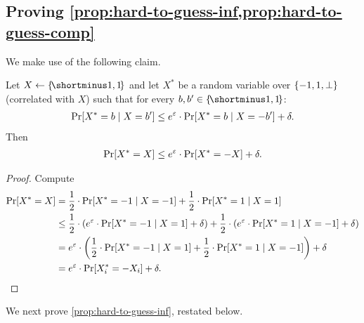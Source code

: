 \subsection{Proving \cref{prop:hard-to-guess-inf,prop:hard-to-guess-comp}}\label{sec:missing-proofs:hard-to-guess}

We make use of the following claim.

\begin{claim}\label{claim:X-star}
    Let $X \la \oo$ and let $X^*$ be a random variable over $\set{-1,1,\bot}$ (correlated with $X$) such that for every $b,b' \in \oo$:
    \begin{align*}
        \pr{X^* = b \mid X = b'} \leq e^{\eps}\cdot \pr{X^* = b \mid X = -b'} + \delta.
    \end{align*}
    Then
    \begin{align*}
        \pr{X^* = X} \leq e^{\eps}\cdot \pr{X^* = -X} + \delta.
    \end{align*}
\end{claim}
\begin{proof}
    Compute
    \begin{align*}
        \pr{X^* = X } 
        &= \frac12 \cdot \pr{X^* = -1 \mid X = -1} + \frac12 \cdot \pr{X^* = 1 \mid X = 1}\\
        &\leq  \frac12 \cdot \paren{e^{\eps}\cdot \pr{X^* = -1 \mid X = 1} + \delta} + \frac12 \cdot \paren{e^{\eps}\cdot \pr{X^* = 1 \mid X = -1} + \delta}\\
        &= e^{\eps} \cdot \paren{\frac12 \cdot \pr{X^* = -1 \mid X = 1} + \frac12 \cdot \pr{X^* = 1 \mid X = -1}} + \delta\\
        &= e^{\eps} \cdot \pr{X^*_i = -X_i} + \delta.
    \end{align*}
\end{proof}


We next prove \cref{prop:hard-to-guess-inf}, restated below.

